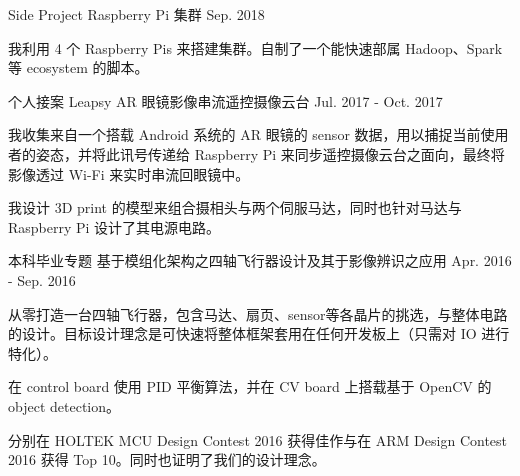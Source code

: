 

\begin{cventries}

  \cventry
    {Side Project} %
    {Raspberry Pi 集群} %
    {} %
    {Sep. 2018} %
    {
      \begin{cvitems} %
        \item {我利用 4 个 Raspberry Pis 来搭建集群。自制了一个能快速部属 Hadoop、Spark 等 ecosystem 的脚本。}
      \end{cvitems}
    }

  \cventry
    {个人接案} %
    {Leapsy AR 眼镜影像串流遥控摄像云台} %
    {} %
    {Jul. 2017 - Oct. 2017} %
    {
      \begin{cvitems} %
        \item {我收集来自一个搭载 Android 系统的 AR 眼镜的 sensor 数据，用以捕捉当前使用者的姿态，并将此讯号传递给 Raspberry Pi 来同步遥控摄像云台之面向，最终将影像透过 Wi-Fi 来实时串流回眼镜中。}
        \item {我设计 3D print 的模型来组合摄相头与两个伺服马达，同时也针对马达与 Raspberry Pi 设计了其电源电路。}
      \end{cvitems}
    }

  \cventry
    {本科毕业专题} %
    {基于模组化架构之四轴飞行器设计及其于影像辨识之应用} %
    {} %
    {Apr. 2016 - Sep. 2016} %
    {
      \begin{cvitems} %
        \item {从零打造一台四轴飞行器，包含马达、扇页、sensor等各晶片的挑选，与整体电路的设计。目标设计理念是可快速将整体框架套用在任何开发板上（只需对 IO 进行特化）。}
        \item {在 control board 使用 PID 平衡算法，并在 CV board 上搭载基于 OpenCV 的 object detection。}
        \item {分别在 HOLTEK MCU Design Contest 2016 获得佳作与在 ARM Design Contest 2016 获得 Top 10。同时也证明了我们的设计理念。}
      \end{cvitems}
    }

\end{cventries}
